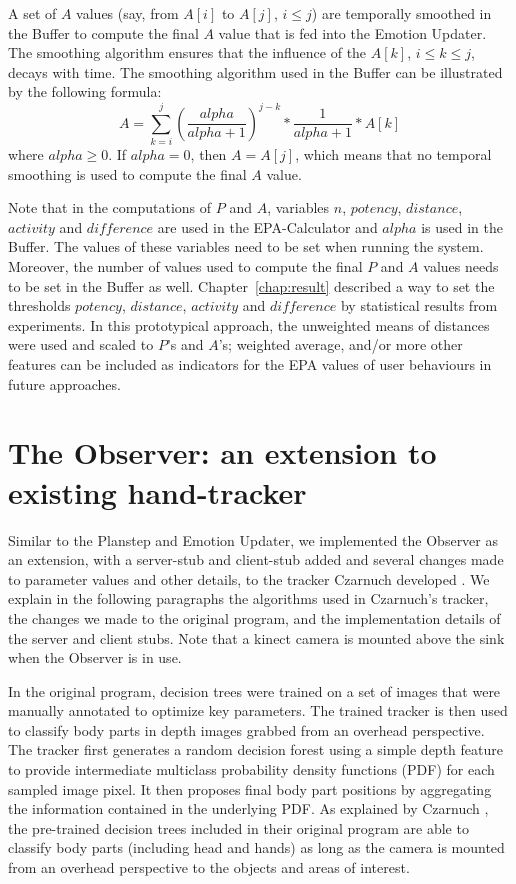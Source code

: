 A set of $A$ values (say, from $A[i]$ to $A[j]$, $i \leq j$) are temporally smoothed in the Buffer to compute the final $A$ value that is fed into the Emotion Updater. The smoothing algorithm ensures that the influence of the $A[k]$, $i \leq k \leq j$, decays with time. The smoothing algorithm used in the Buffer can be illustrated by the following formula:
$$A=\sum_{k=i}^{j}(\dfrac{alpha}{alpha+1})^{j-k}*\dfrac{1}{alpha+1}*A[k]$$ where $alpha \geq 0$.
If $alpha=0$, then $A=A[j]$, which means that no temporal smoothing is used to compute the final $A$ value.

Note that in the computations of $P$ and $A$, variables $n$, $potency$, $distance$, $activity$ and $difference$ are used in the EPA-Calculator and $alpha$ is used in the Buffer. The values of these variables need to be set when running the system. Moreover, the number of values used to compute the final $P$ and $A$ values needs to be set in the Buffer as well. Chapter~\ref{chap:result} described a way to set the thresholds $potency$, $distance$, $activity$ and $difference$ by statistical results from experiments. In this prototypical approach, the unweighted means of distances were used and scaled to $P$'s and $A$'s; weighted average, and/or more other features can be included as indicators for the EPA values of user behaviours in future approaches.

\section{The Observer: an extension to existing hand-tracker}

Similar to the Planstep and Emotion Updater, we implemented the Observer as an extension, with a server-stub and client-stub added and several changes made to parameter values and other details, to the tracker Czarnuch developed \cite{czarnuch2014}. We explain in the following paragraphs the algorithms used in Czarnuch's tracker, the changes we made to the original program, and the implementation details of the server and client stubs. Note that a kinect camera is mounted above the sink when the Observer is in use.

In the original program, decision trees were trained on a set of images that were manually annotated to optimize key parameters. The trained tracker is then used to classify body parts in depth images grabbed from an overhead perspective. The tracker first generates a random decision forest using a simple depth feature to provide intermediate multiclass probability density functions (PDF) for each sampled image pixel. It then proposes final body part positions by aggregating the information contained in the underlying PDF. As explained by Czarnuch \cite{czarnuch2014}, the pre-trained decision trees included in their original program are able to classify body parts (including head and hands) as long as the camera is mounted from an overhead perspective to the objects and areas of interest. 

